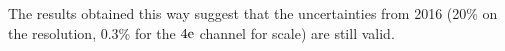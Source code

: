 The results obtained this way suggest that the uncertainties from 2016 (20\% on the resolution, 0.3\% for the $4\mathrm{e}$ channel for scale) are still valid. 




